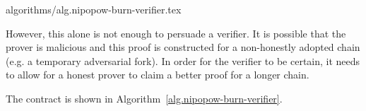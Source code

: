 {algorithms/alg.nipopow-burn-verifier.tex}

However, this alone is not enough to persuade a verifier. It is possible that the prover is malicious and this proof is constructed for a non-honestly adopted chain (e.g. a temporary adversarial fork). In order for the verifier to be certain, it needs to allow for a honest prover to claim a better proof for a longer chain. 

The contract is shown in Algorithm~\ref{alg.nipopow-burn-verifier}.
